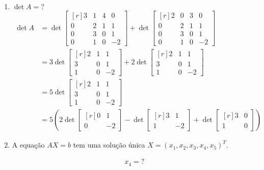 \begin{enumerate}[label=\alph*.]
	\item $\det A = ?$
		\begin{align*}
			\det A
			&=
			\det
			\begin{bmatrix*}[r]
				3 & 1 & 4 & 0\\
				0 & 2 & 1 & 1\\
				0 & 3 & 0 & 1\\
				0 & 1 & 0 & -2
			\end{bmatrix*}
			+
			\det
			\begin{bmatrix*}[r]
				2 & 0 & 3 & 0\\
				0 & 2 & 1 & 1\\
				0 & 3 & 0 & 1\\
				0 & 1 & 0 & -2
			\end{bmatrix*}\\
			&=
			3
			\det
			\begin{bmatrix*}[r]
				 2 & 1 & 1\\
				 3 & 0 & 1\\
				 1 & 0 & -2
			\end{bmatrix*}
			+
			2
			\det
			\begin{bmatrix*}[r]
				 2 & 1 & 1\\
				 3 & 0 & 1\\
				 1 & 0 & -2
			\end{bmatrix*}\\
			&=
			5
			\det
			\begin{bmatrix*}[r]
				 2 & 1 & 1\\
				 3 & 0 & 1\\
				 1 & 0 & -2
			\end{bmatrix*}\\
			&=
			5\left(
			2
			\det
			\begin{bmatrix*}[r]
				  0 & 1\\
				  0 & -2
			\end{bmatrix*}
			-
			\det
			\begin{bmatrix*}[r]
				 3 & 1\\
				 1 & -2
			\end{bmatrix*}
			+
			\det
			\begin{bmatrix*}[r]
				 3 & 0\\
				 1 & 0
			\end{bmatrix*}\right)
		\end{align*}
	\item\hfill
		\begin{proposition}
			A equação $AX = b$ tem uma solução única
			$X = (x_1, x_2, x_3, x_4, x_5)^T$.
		\end{proposition}
		\begin{align*}
			x_4 = ?
		\end{align*}
\end{enumerate}
